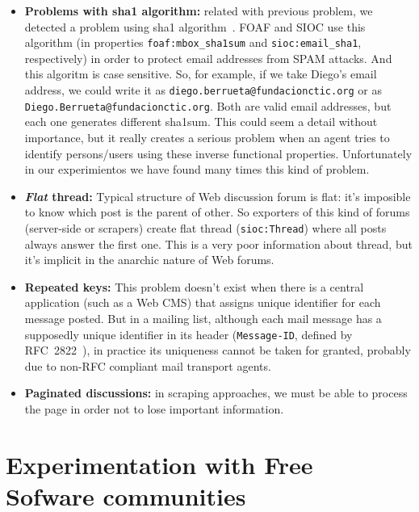 \documentclass{../templates/www2008-submission}
\begin{document}
\begin{itemize}
  \item \textbf{Problems with sha1 algorithm:} related with previous problem,
	we detected a problem using sha1 algorithm~\cite{Eastlake2001}. FOAF 
	and SIOC use this algorithm (in properties \texttt{foaf:mbox\_sha1sum} 
	and \texttt{sioc:email\_sha1}, respectively) in order to protect email 
	addresses from SPAM attacks. And this algoritm is case sensitive. So,
	for example, if we take Diego's email address, we could write it as
	\texttt{diego.berrueta@fundacionctic.org} or as \texttt{Diego.Berrueta@fundacionctic.org}.
	Both are valid email addresses, but each one generates different sha1sum.
	This could  seem a detail without importance, but it really creates a 
	serious problem when an agent tries to identify persons/users using these
	inverse functional properties. Unfortunately in our experimientos we 
	have found many times this kind of problem.

  \item \textbf{\textit{Flat} thread:} Typical structure of Web discussion
	forum is flat: it's imposible to know which post is the parent of
	other. So exporters of this kind of forums (server-side or scrapers)
	create flat thread (\texttt{sioc:Thread}) where all posts always answer
	the first one. This is a very poor information about thread, but it's
	implicit in the anarchic nature of Web forums.

  \item \textbf{Repeated keys:} This problem doesn't exist when there is a 
	central application (such as a Web CMS) that assigns unique identifier 
	for each message posted. But in a mailing list, although each mail 
	message has a supposedly unique identifier in its header 
	(\texttt{Message-ID}, defined by RFC~2822~\cite{RFC2822}), 
	in practice its uniqueness cannot be taken for granted,
	probably due to non-RFC compliant mail transport agents.

  \item \textbf{Paginated discussions:} in scraping approaches, we must be able 
	to process the page in order not to lose important information.

\end{itemize}


\section{Experimentation with Free\\ Sofware communities}
\end{document}
